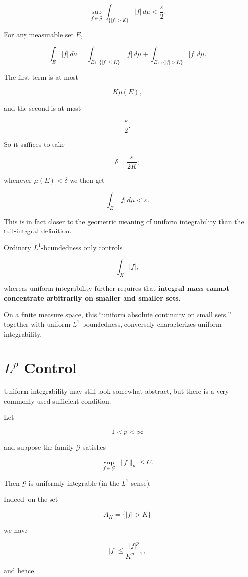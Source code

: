 \documentclass[11pt]{article}
\begin{document}
\[
\sup_{f\in\mathcal G}
\int_{\{|f|>K\}}|f|\,d\mu
<
\frac{\varepsilon}{2}.
\]

For any measurable set $E$,

\[
\int_E|f|\,d\mu
=
\int_{E\cap\{|f|\leq K\}}|f|\,d\mu
+
\int_{E\cap\{|f|>K\}}|f|\,d\mu.
\]

The first term is at most

\[
K\mu(E),
\]

and the second is at most

\[
\frac{\varepsilon}{2}.
\]

So it suffices to take

\[
\delta=\frac{\varepsilon}{2K};
\]

whenever $\mu(E)<\delta$ we then get

\[
\int_E|f|\,d\mu<\varepsilon.
\]

This is in fact closer to the geometric meaning of uniform integrability than the tail-integral definition.

Ordinary $L^1$-boundedness only controls

\[
\int_X|f|,
\]

whereas uniform integrability further requires that \textbf{integral mass cannot concentrate arbitrarily on smaller and smaller sets.}

On a finite measure space, this ``uniform absolute continuity on small sets,'' together with uniform $L^1$-boundedness, conversely characterizes uniform integrability.


\section{$L^p$ Control}


Uniform integrability may still look somewhat abstract, but there is a very commonly used sufficient condition.

Let

\[
1<p<\infty
\]

and suppose the family $\mathcal G$ satisfies

\[
\sup_{f\in\mathcal G}\|f\|_p\leq C.
\]

Then $\mathcal G$ is uniformly integrable (in the $L^1$ sense).

Indeed, on the set

\[
A_K=\{|f|>K\}
\]

we have

\[
|f|
\leq
\frac{|f|^p}{K^{p-1}},
\]

and hence
\end{document}
